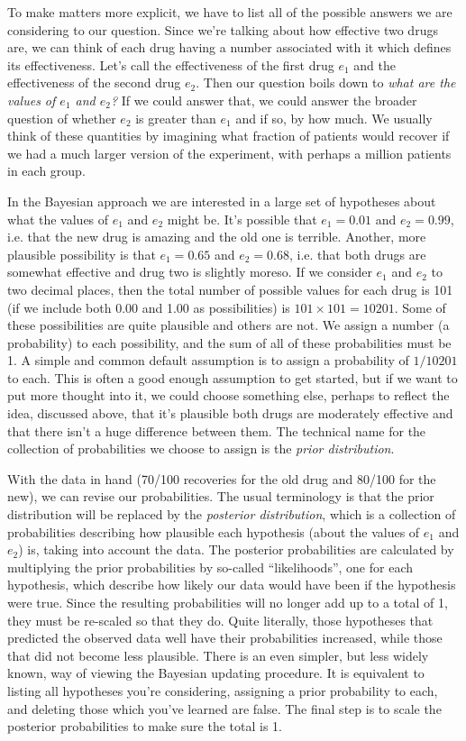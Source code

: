 \documentclass[a4paper, 12pt]{article}
\begin{document}
To make matters more explicit, we have to list all of the possible answers
we are considering to our question. Since we're talking about how effective
two drugs are, we can think of each drug having a number associated with it
which defines its effectiveness. Let's call the effectiveness of the first drug
$e_1$ and the effectiveness of the second drug $e_2$. Then our question boils
down to {\em what are the values of $e_1$ and $e_2$?} If we could answer that,
we could answer the broader question of whether $e_2$ is greater than $e_1$ and
if so, by how much. We usually think of these quantities by imagining what
fraction of patients would recover if we had a much larger version of the
experiment, with perhaps a million patients in each group.

In the Bayesian approach we are interested in a large set of hypotheses about
what the values of $e_1$ and $e_2$ might be. It's possible that $e_1=0.01$ and
$e_2 = 0.99$, i.e. that the new drug is amazing and the old one is terrible.
Another, more plausible possibility is that $e_1 = 0.65$ and $e_2=0.68$, i.e.
that both drugs are somewhat effective and drug two is slightly moreso. If we
consider $e_1$ and $e_2$ to two decimal places, then the total number of
possible values for each drug is 101 (if we include both 0.00 and 1.00 as
possibilities) is $101 \times 101 = 10201$.
Some of these possibilities are
quite plausible and others are not. We assign a number (a probability) to each
possibility, and the sum of all of these probabilities must be 1. A simple and
common default assumption is to assign a probability of $1/10201$ to each.
This is often a good enough assumption to get started, but if we want to put
more thought into it, we could choose something else, perhaps to reflect the
idea, discussed above, that it's plausible both drugs are moderately effective
and that there isn't a huge difference between them.
The technical name for the collection of
probabilities we choose to assign is the {\em prior distribution}.

With the data in hand (70/100 recoveries for the old drug and 80/100 for the
new), we can revise our probabilities. The usual terminology is that the
prior distribution will be replaced by the {\em posterior distribution}, which
is a collection of probabilities describing how plausible each hypothesis
(about the values of $e_1$ and $e_2$) is, taking into account the data.
The posterior probabilities are calculated by multiplying the prior probabilities
by so-called ``likelihoods'', one for each hypothesis,
which describe how likely our data would have been if the hypothesis were true.
Since the resulting probabilities will no longer add up to a total of 1, they
must be re-scaled so that they do.
Quite literally, those hypotheses that predicted the observed data well have
their probabilities increased, while those that did not become less
plausible.
There is an even simpler, but less widely known,
way of viewing the Bayesian updating procedure. It is equivalent to listing
all hypotheses you're considering, assigning a prior probability to each, and
deleting those which you've learned are false. The final step is to scale the
posterior probabilities to make sure the total is 1.
\end{document}
